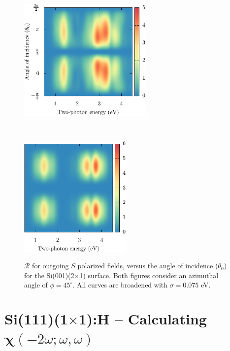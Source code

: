 \documentclass[11pt]{book}
\begin{document}
\begin{figure}
    \begin{minipage}[b]{0.5\textwidth}
        \centering
        \includegraphics[height=6cm]{../figures/04-results/fig-4_2_03}
        \label{fig:2x1rps3d}
    \end{minipage}
    ~
    \begin{minipage}[b]{0.5\textwidth}
        \centering
        \includegraphics[height=5.945cm]{../figures/04-results/fig-4_2_04}
        \label{fig:2x1rss3d}
    \end{minipage}
    \caption{$\mathcal{R}$ for outgoing $S$ polarized fields, versus the angle
    of incidence ($\theta_{0}$) for the Si(001)(2$\times$1) surface. Both
    figures consider an azimuthal angle of $\phi = 45^{\circ}$. All curves are
    broadened with $\sigma = 0.075$ eV.}
    \label{fig:2x1rS3d}
\end{figure}





\section{
\texorpdfstring{Si(111)(1$\times$1):H}{Si(111)(1x1):H} --
Calculating
\texorpdfstring{$\boldsymbol{\chi}(-2\omega;\omega,\omega)$}{X(-2w;w,w)}
}
\end{document}
